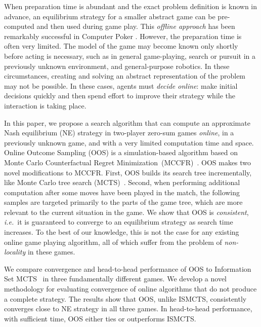 \documentclass{aamas2015}
\newcounter{mlNoteCounter}
\newcommand{\mlnote}[1]{{\scriptsize \color{darkgreen} $\blacksquare$ \refstepcounter{mlNoteCounter}\textsf{[ML]$_{\arabic{mlNoteCounter}}$:{#1}}}}
\renewcommand{\mlnote}[1]{}
\newcommand{\ie}{{\it i.e.}~}
\begin{document}
When preparation time is abundant and the exact problem definition is known in advance, an equilibrium strategy for a smaller abstract game can be pre-computed and 
then used during game play. This {\it offline approach} has been remarkably successful in 
Computer Poker \cite{bowling2015heads,Gilpin09,Sandholm10The,Rubin11Poker,Johanson13Evaluating}.
However, the preparation time is often very limited. The model of the game may become known only shortly before acting is necessary, such as in general game-playing, search or pursuit in a previously unknown environment, and general-purpose robotics. 
In these circumstances, creating and solving an abstract representation of the problem may not be possible. In these cases, agents must {\it decide online}: make initial decisions quickly and then spend effort to improve their strategy while the interaction is taking place.

In this paper, we propose a search algorithm that can compute an approximate Nash equilibrium (NE) strategy in two-player zero-sum games {\it online}, in a previously unknown game, and with a very limited computation time and space. 
Online Outcome Sampling (OOS) is a simulation-based algorithm based on Monte Carlo Counterfactual Regret Minimization~(MCCFR)~\cite{Lanctot09Sampling}. 
OOS makes two novel modifications to MCCFR. First, OOS builds its search tree incrementally, like Monte Carlo tree search 
(MCTS)~\cite{Coulom06Efficient,mctssurvey,UCT}. Second, when performing additional computation after some moves have been played in the match, the following samples are targeted primarily to the parts of the game tree, which are more relevant to the current situation in the game.
We show that OOS is {\it consistent}, \ie it is guaranteed to converge to an equilibrium strategy as search time increases. To the best of our knowledge, this is not the case for any existing online game playing algorithm, all of which suffer from the problem of \emph{non-locality} in these games.

We compare convergence and head-to-head performance of OOS to Information Set 
MCTS~\cite{Cowling12ISMCTS,Whitehouse13Integrating,Lisy14selection} in three fundamentally different games. 
We develop a novel methodology for evaluating convergence of online algorithms that do not produce a complete strategy. 
The results show that OOS, unlike ISMCTS, consistently converges close to NE strategy in all three games. In head-to-head performance, with sufficient time, OOS either ties or outperforms ISMCTS. 
\end{document}
